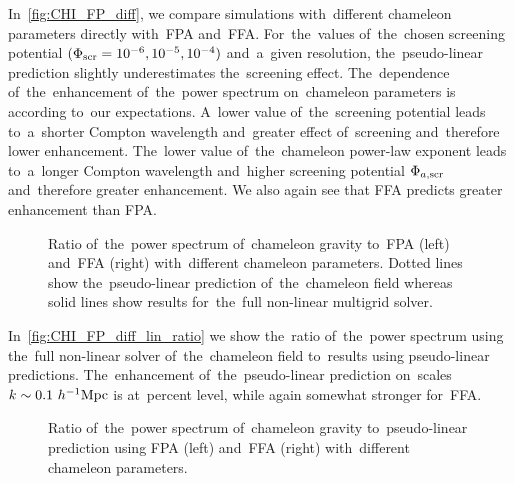 In~\autoref{fig:CHI_FP_diff}, we compare simulations with~different chameleon parameters directly with~FPA and~FFA. For~the~values of~the~chosen screening potential $(\Phi_{\text{\scriptsize scr}}=10^{-6}, 10^{-5}, 10^{-4})$ and~a~given resolution, the~pseudo-linear prediction slightly underestimates the~screening effect. The~dependence of~the~enhancement of~the~power spectrum on~chameleon parameters is according to~our expectations. A~lower value of~the~screening potential leads to~a~shorter Compton wavelength and~greater effect of~screening and~therefore lower enhancement. The~lower value of~the~chameleon power-law exponent leads to~a~longer Compton wavelength and~higher screening potential $\Phi_{a,\text{\scriptsize scr}}$ and~therefore greater enhancement. We also again see that FFA predicts greater enhancement than FPA.

\begin{figure}[tb]
  \centering
  \chileft
	\begin{subfigure}{1.2\textwidth}
	\end{subfigure}
	\begin{subfigure}{0.5\textwidth}
	\end{subfigure}
	\begin{subfigure}{0.5\textwidth}
	\end{subfigure}
  \caption{Ratio of~the~power spectrum of~chameleon gravity to~FPA (left) and~FFA (right) with~different chameleon parameters. Dotted lines show the~pseudo-linear prediction of~the~chameleon field whereas solid lines show results for~the~full non-linear multigrid solver.}
  \label{fig:CHI_FP_diff}
\end{figure}

In~\autoref{fig:CHI_FP_diff_lin_ratio} we show the~ratio of~the~power spectrum using the~full non-linear solver of~the~chameleon field to~results using pseudo-linear predictions. The~enhancement of~the~pseudo-linear prediction on~scales $k\sim0.1~h^{-1}\text{Mpc}$ is at~percent level, while again somewhat stronger for~FFA.

\begin{figure}[!tb]
  \centering
	\begin{subfigure}{1.2\textwidth}
		\chileft
	\end{subfigure}
	\begin{subfigure}{0.5\textwidth}
	\end{subfigure}
	\begin{subfigure}{0.5\textwidth}
	\end{subfigure}
  \caption{Ratio of~the~power spectrum of~chameleon gravity to~pseudo-linear prediction using FPA (left) and~FFA (right) with~different chameleon parameters.}
  \label{fig:CHI_FP_diff_lin_ratio}
\end{figure}


